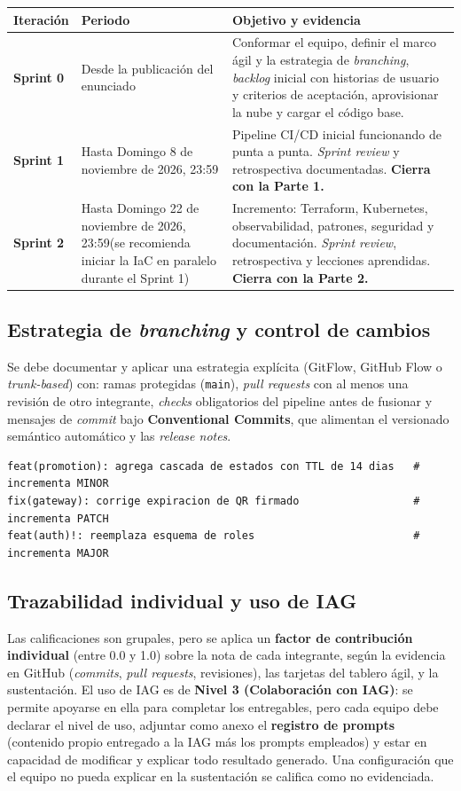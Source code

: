 \documentclass[10pt,letterpaper]{article}
\newcommand{\fechaParteUno}{Domingo 8 de noviembre de 2026, 23:59}
\newcommand{\fechaParteDos}{Domingo 22 de noviembre de 2026, 23:59}
\begin{document}
\vspace{0.04cm}
\noindent\small
\begin{tabularx}{\textwidth}{|L{2.4cm}|L{4.2cm}|X|}
\hline
{}
\textbf{Iteración} & \textbf{Periodo} & \textbf{Objetivo y evidencia} \\ \hline
\textbf{Sprint 0} & Desde la publicación del enunciado & Conformar el equipo, definir el marco ágil y la estrategia de \textit{branching}, \textit{backlog} inicial con historias de usuario y criterios de aceptación, aprovisionar la nube y cargar el código base. \\ \hline
\textbf{Sprint 1} & Hasta \fechaParteUno & Pipeline CI/CD inicial funcionando de punta a punta. \textit{Sprint review} y retrospectiva documentadas. \textbf{Cierra con la Parte 1.} \\ \hline
\textbf{Sprint 2} & Hasta \fechaParteDos (se recomienda iniciar la IaC en paralelo durante el Sprint 1) & Incremento: Terraform, Kubernetes, observabilidad, patrones, seguridad y documentación. \textit{Sprint review}, retrospectiva y lecciones aprendidas. \textbf{Cierra con la Parte 2.} \\ \hline
\end{tabularx}

\subsection{Estrategia de \textit{branching} y control de cambios}
Se debe documentar y aplicar una estrategia explícita (GitFlow, GitHub Flow o \textit{trunk-based}) con: ramas protegidas (\texttt{main}), \textit{pull requests} con al menos una revisión de otro integrante, \textit{checks} obligatorios del pipeline antes de fusionar y mensajes de \textit{commit} bajo \textbf{Conventional Commits}, que alimentan el versionado semántico automático y las \textit{release notes}.

\begin{lstlisting}[style=bashstyle]
feat(promotion): agrega cascada de estados con TTL de 14 dias   # incrementa MINOR
fix(gateway): corrige expiracion de QR firmado                  # incrementa PATCH
feat(auth)!: reemplaza esquema de roles                         # incrementa MAJOR
\end{lstlisting}

\subsection{Trazabilidad individual y uso de IAG}
Las calificaciones son grupales, pero se aplica un \textbf{factor de contribución individual} (entre 0.0 y 1.0) sobre la nota de cada integrante, según la evidencia en GitHub (\textit{commits}, \textit{pull requests}, revisiones), las tarjetas del tablero ágil, y la sustentación. El uso de IAG es de \textbf{Nivel 3 (Colaboración con IAG)}: se permite apoyarse en ella para completar los entregables, pero cada equipo debe declarar el nivel de uso, adjuntar como anexo el \textbf{registro de prompts} (contenido propio entregado a la IAG más los prompts empleados) y estar en capacidad de modificar y explicar todo resultado generado. Una configuración que el equipo no pueda explicar en la sustentación se califica como no evidenciada.
\end{document}

